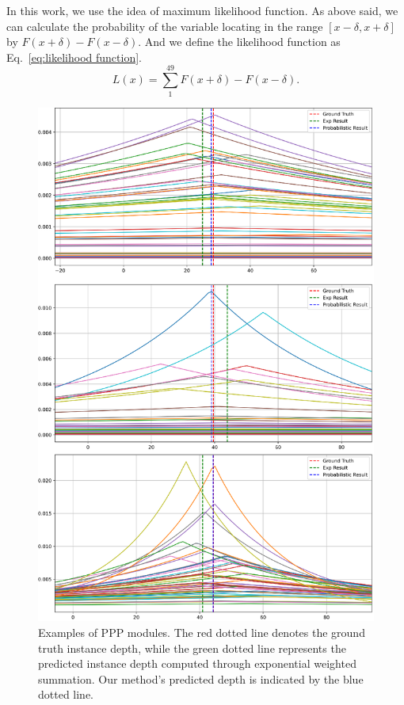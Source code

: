 \documentclass[journal]{IEEEtran}
\begin{document}
	In this work, we use the idea of maximum likelihood function. As above said, we can calculate the probability of the variable locating in the range $[x-\delta, x+\delta]$ by $F(x+\delta)-F(x-\delta)$. And we define the likelihood function as Eq.~\eqref{eq:likelihood function}. 
	\begin{equation}
		L(x) = \sum_{1}^{49} F(x+\delta)-F(x-\delta).
		\label{eq:likelihood function}
	\end{equation}
	
	\begin{figure}[!ht]
		\centering
		\includegraphics[width=1.0\linewidth]{ppp.eps}
		\caption{Examples of PPP modules. The red dotted line denotes the ground truth instance depth, while the green dotted line represents the predicted instance depth computed through exponential weighted summation. Our method's predicted depth is indicated by the blue dotted line.}
		\label{fig:ppp}
	\end{figure}
	
\end{document}

